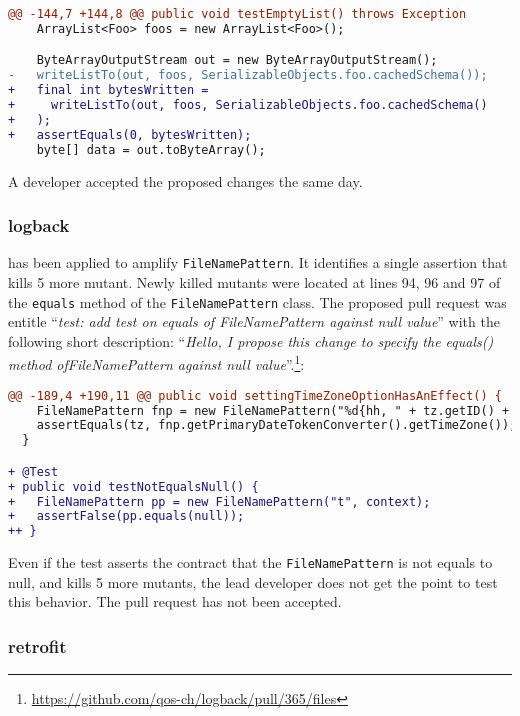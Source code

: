 \begin{lstlisting}[language=diff,caption=Test-improvement proposed to protostuff developers.,label=lst:pr-protostuff]
@@ -144,7 +144,8 @@ public void testEmptyList() throws Exception
    ArrayList<Foo> foos = new ArrayList<Foo>();

    ByteArrayOutputStream out = new ByteArrayOutputStream();
-   writeListTo(out, foos, SerializableObjects.foo.cachedSchema());
+   final int bytesWritten =
+     writeListTo(out, foos, SerializableObjects.foo.cachedSchema()
+   );
+   assertEquals(0, bytesWritten);
    byte[] data = out.toByteArray();
\end{lstlisting}

A developer accepted the proposed changes the same day.

\subsubsection{logback}

\dspot has been applied to amplify \texttt{FileNamePattern}. 
It identifies a single assertion that kills 5 more mutant. 
Newly killed mutants were located at lines 94, 96 and 97 of the \texttt{equals} method of the \texttt{FileNamePattern} class. 
The proposed pull request was entitle ``\emph{test: add test on equals of FileNamePattern against null value}'' with the following short description: ``\emph{Hello, I propose this change to specify the equals() method ofFileNamePattern against null value}''.\footnote{\url{https://github.com/qos-ch/logback/pull/365/files}}:

\begin{lstlisting}[language=diff,caption=Test-improvement proposed to logback developers.,label=lst:pr-logback]
@@ -189,4 +190,11 @@ public void settingTimeZoneOptionHasAnEffect() {
    FileNamePattern fnp = new FileNamePattern("%d{hh, " + tz.getID() + "}", context);
    assertEquals(tz, fnp.getPrimaryDateTokenConverter().getTimeZone());
  }

+ @Test
+ public void testNotEqualsNull() {
+   FileNamePattern pp = new FileNamePattern("t", context);
+   assertFalse(pp.equals(null));
++ }
\end{lstlisting}

Even if the test asserts the contract that the \texttt{FileNamePattern} is not equals to null, and kills 5 more mutants, the lead developer does not get the point to test this behavior. 
The pull request has not been accepted.

\subsubsection{retrofit}

